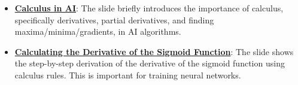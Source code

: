 \documentclass{article}%
\begin{document}
\begin{itemize}[leftmargin=*]
\item \href{https://purdue.brightspace.com/d2l/common/assets/pdfjs-d2l-dist/1.0.14-legacy/web/viewer.html?file=%2Fcontent%2Fenforced%2F1095467-wl.202510.CS.24300.001%2F04L1-Linear Algebra Primer.pdf%3Fou%3D1095467&lang=en-us&container=d2l-fileviewer-rendered-pdf&fullscreen=d2l-fileviewer-rendered-pdf-dialog&height=667#page=19}{\textbf{Calculus in AI}}: The slide briefly introduces the importance of calculus, specifically derivatives, partial derivatives, and finding maxima/minima/gradients, in AI algorithms.%
\item \href{https://purdue.brightspace.com/d2l/common/assets/pdfjs-d2l-dist/1.0.14-legacy/web/viewer.html?file=%2Fcontent%2Fenforced%2F1095467-wl.202510.CS.24300.001%2F04L1-Linear Algebra Primer.pdf%3Fou%3D1095467&lang=en-us&container=d2l-fileviewer-rendered-pdf&fullscreen=d2l-fileviewer-rendered-pdf-dialog&height=667#page=21}{\textbf{Calculating the Derivative of the Sigmoid Function}}: The slide shows the step-by-step derivation of the derivative of the sigmoid function using calculus rules. This is important for training neural networks.%
\end{itemize}%
\end{document}
